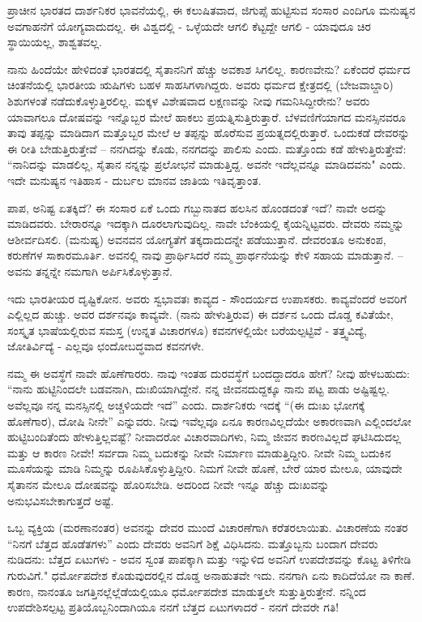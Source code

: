 ಪ್ರಾಚೀನ ಭಾರತದ ದಾರ್ಶನಿಕರ ಭಾವನೆಯಲ್ಲಿ, ಈ ಕಲುಷಿತವಾದ, ಜಿಗುಪ್ಸೆ ಹುಟ್ಟಿಸುವ ಸಂಸಾರ ಎಂದಿಗೂ ಮನುಷ್ಯನ ಅವಗಾಹನೆಗೆ ಯೋಗ್ಯವಾದುದಲ್ಲ. ಈ ವಿಶ್ವದಲ್ಲಿ - ಒಳ್ಳೆಯದೇ ಆಗಲಿ ಕೆಟ್ಟದ್ದೇ ಆಗಲಿ - ಯಾವುದೂ ಚಿರ ಸ್ಥಾಯಿಯಲ್ಲ, ಶಾಶ್ವತವಲ್ಲ.

ನಾನು ಹಿಂದೆಯೇ ಹೇಳಿದಂತೆ ಭಾರತದಲ್ಲಿ ಸೈತಾನನಿಗೆ ಹೆಚ್ಚು ಅವಕಾಶ ಸಿಗಲಿಲ್ಲ. ಕಾರಣವೇನು? ಏಕೆಂದರೆ ಧರ್ಮದ ಚಿಂತನೆಯಲ್ಲಿ ಭಾರತೀಯ ಋಷಿಗಳು ಬಹಳ ಸಾಹಸಿಗಳಾಗಿದ್ದರು. ಅವರು ಧರ್ಮದ ಕ್ಷೇತ್ರದಲ್ಲಿ (ಬೇಜವಾಬ್ದಾರಿ) ಶಿಶುಗಳಂತೆ ನಡೆದುಕೊಳ್ಳುತ್ತಿರಲಿಲ್ಲ. ಮಕ್ಕಳ ವಿಶೇಷವಾದ ಲಕ್ಷಣವನ್ನು ನೀವು ಗಮನಿಸಿದ್ದೀರೇನು? ಅವರು ಯಾವಾಗಲೂ ದೋಷವನ್ನು ಇನ್ನೊಬ್ಬರ ಮೇಲೆ ಹಾಕಲು ಪ್ರಯತ್ನಿಸುತ್ತಿರುತ್ತಾರೆ. ಬೆಳವಣಿಗೆಯಾಗದ ಮನಸ್ಸಿನವರೂ ತಾವು ತಪ್ಪನ್ನು ಮಾಡಿದಾಗ ಮತ್ತೊಬ್ಬರ ಮೇಲೆ ಆ ತಪ್ಪನ್ನು ಹೊರೆಸುವ ಪ್ರಯತ್ನದಲ್ಲಿರುತ್ತಾರೆ. ಒಂದುಕಡೆ ದೇವರನ್ನು ಈ ರೀತಿ ಬೇಡುತ್ತಿರುತ್ತೇವೆ – ನನಗಿದನ್ನು ಕೊಡು, ನನಗದನ್ನು ಪಾಲಿಸು ಎಂದು. ಮತ್ತೊಂದು ಕಡೆ ಹೇಳುತ್ತಿರುತ್ತೇವೆ: “ನಾನಿದನ್ನು ಮಾಡಲಿಲ್ಲ, ಸೈತಾನ ನನ್ನನ್ನು ಪ್ರಲೋಭನೆ ಮಾಡುತ್ತಿದ್ದ. ಅವನೇ ಇದೆಲ್ಲವನ್ನೂ ಮಾಡಿದವನು" ಎಂದು. ಇದೇ ಮನುಷ್ಯನ ಇತಿಹಾಸ - ದುರ್ಬಲ ಮಾನವ ಜಾತಿಯ ಇತಿವೃತ್ತಾಂತ.

ಪಾಪ, ಅನಿಷ್ಟ ಏತಕ್ಕಿದೆ? ಈ ಸಂಸಾರ ಏಕೆ ಒಂದು ಗಬ್ಬುನಾತದ ಹಲಸಿನ ಹೊಂಡದಂತೆ ಇದೆ? ನಾವೇ ಅದನ್ನು ಮಾಡಿದವರು. ಬೇರಾರನ್ನೂ ಇದಕ್ಕಾಗಿ ದೂರಲಾಗುವುದಿಲ್ಲ. ನಾವೇ ಬೆಂಕಿಯಲ್ಲಿ ಕೈಯನ್ನಿಟ್ಟವರು. ದೇವರು ನಮ್ಮನ್ನು ಆಶೀರ್ವದಿಸಲಿ. (ಮನುಷ್ಯ) ಅವನವನ ಯೋಗ್ಯತೆಗೆ ತಕ್ಕದಾದುದನ್ನೇ ಪಡೆಯುತ್ತಾನೆ. ದೇವರಂತೂ ಅನುಕಂಪ, ಕರುಣೆಗಳ ಸಾಕಾರಮೂರ್ತಿ. ಅವನಲ್ಲಿ ನಾವು ಪ್ರಾರ್ಥಿಸಿದರೆ ನಮ್ಮ ಪ್ರಾರ್ಥನೆಯನ್ನು ಕೇಳಿ ಸಹಾಯ ಮಾಡುತ್ತಾನೆ. – ಅವನು ತನ್ನನ್ನೇ ನಮಗಾಗಿ ಅರ್ಪಿಸಿಕೊಳ್ಳುತ್ತಾನೆ.

ಇದು ಭಾರತೀಯರ ದೃಷ್ಟಿಕೋನ. ಅವರು ಸ್ವಭಾವತಃ ಕಾವ್ಯದ - ಸೌಂದರ್ಯದ ಉಪಾಸಕರು. ಕಾವ್ಯವೆಂದರೆ ಅವರಿಗೆ ಎಲ್ಲಿಲ್ಲದ ಹುಚ್ಚು. ಅವರ ದರ್ಶನವೂ ಕಾವ್ಯವೇ. (ನಾನು ಹೇಳುತ್ತಿರುವ) ಈ ದರ್ಶನ ಒಂದು ದೊಡ್ಡ ಕವಿತೆಯೇ, ಸಂಸ್ಕೃತ ಭಾಷೆಯಲ್ಲಿರುವ ಸಮಸ್ತ (ಉನ್ನತ ವಿಚಾರಗಳೂ) ಕವನಗಳಲ್ಲಿಯೇ ಬರೆಯಲ್ಪಟ್ಟಿವೆ - ತತ್ತ್ವವಿದ್ಯೆ, ಜೋತಿರ್ವಿದ್ಯೆ - ಎಲ್ಲವೂ ಛಂದೋಬದ್ಧವಾದ ಕವನಗಳೇ.

ನಮ್ಮ ಈ ಅವಸ್ಥೆಗೆ ನಾವೇ ಹೊಣೆಗಾರರು. ನಾವು ಇಂತಹ ದುರವಸ್ಥೆಗೆ ಬಂದದ್ದಾದರೂ ಹೇಗೆ? ನೀವು ಹೇಳಬಹುದು: “ನಾನು ಹುಟ್ಟಿನಿಂದಲೇ ಬಡವನಾಗಿ, ದುಃಖಿಯಾಗಿದ್ದೇನೆ. ನನ್ನ ಜೀವನದುದ್ದಕ್ಕೂ ನಾನು ಪಟ್ಟ ಪಾಡು ಅಷ್ಟಿಷ್ಟಲ್ಲ. ಅವೆಲ್ಲವೂ ನನ್ನ ಮನಸ್ಸಿನಲ್ಲಿ ಅಚ್ಚಳಿಯದೇ ಇದೆ'' ಎಂದು. ದಾರ್ಶನಿಕರು ಇದಕ್ಕೆ “(ಈ ದುಃಖ ಭೋಗಕ್ಕೆ ಹೊಣೆಗಾರ), ದೋಷಿ ನೀನೇ'' ಎನ್ನುವರು. ನೀವು ಇವೆಲ್ಲವೂ ಏನೂ ಕಾರಣವಿಲ್ಲದೆಯೇ ಅಕಾರಣವಾಗಿ ಎಲ್ಲಿಂದಲೋ ಹುಟ್ಟಿಬಂದಿತೆಂದು ಹೇಳುತ್ತಿಲ್ಲವಷ್ಟೆ? ನೀವಾದರೋ ವಿಚಾರವಾದಿಗಳು, ನಿಮ್ಮ ಜೀವನ ಕಾರಣವಿಲ್ಲದೆ ಘಟಿಸಿದುದಲ್ಲ ಮತ್ತು ಆ ಕಾರಣ ನೀವೇ! ಸರ್ವದಾ ನಿಮ್ಮ ಬದುಕನ್ನು ನೀವೇ ನಿರ್ಮಾಣ ಮಾಡುತ್ತಿದ್ದೀರಿ. ನೀವೇ ನಿಮ್ಮ ಬದುಕಿನ ಮೂಸೆಯನ್ನು ಮಾಡಿ ನಿಮ್ಮನ್ನು ರೂಪಿಸಿಕೊಳ್ಳುತ್ತಿದ್ದೀರಿ. ನಿಮಗೆ ನೀವೇ ಹೊಣೆ, ಬೇರೆ ಯಾರ ಮೇಲೂ, ಯಾವುದೇ ಸೈತಾನನ ಮೇಲೂ ದೋಷವನ್ನು ಹೊರಿಸಬೇಡಿ. ಅದರಿಂದ ನೀವೇ ಇನ್ನೂ ಹೆಚ್ಚು ದುಃಖವನ್ನು ಅನುಭವಿಸಬೇಕಾಗುತ್ತದೆ ಅಷ್ಟೆ.

ಒಬ್ಬ ವ್ಯಕ್ತಿಯ (ಮರಣಾನಂತರ) ಅವನನ್ನು ದೇವರ ಮುಂದೆ ವಿಚಾರಣೆಗಾಗಿ ಕರೆತರಲಾಯಿತು. ವಿಚಾರಣೆಯ ನಂತರ “ನಿನಗೆ  ಬೆತ್ತದ ಹೊಡೆತಗಳು'' ಎಂದು ದೇವರು ಅವನಿಗೆ ಶಿಕ್ಷೆ ವಿಧಿಸಿದನು. ಮತ್ತೊಬ್ಬನು ಬಂದಾಗ ದೇವರು ನುಡಿದನು:  ಬೆತ್ತದ ಏಟುಗಳು -  ಅವನ ಸ್ವಂತ ಪಾಪಕ್ಕಾಗಿ ಮತ್ತು ಇನ್ನುಳಿದ  ಅವನಿಗೆ ಉಪದೇಶವನ್ನು ಕೊಟ್ಟ ತಿಳಿಗೇಡಿ ಗುರುವಿಗೆ." ಧರ್ಮೋಪದೇಶ ಕೊಡುವುದರಲ್ಲಿನ ದೊಡ್ಡ ಅನಾಹುತವೇ ಇದು. ನನಗಾಗಿ ಏನು ಕಾದಿದೆಯೋ ನಾ ಕಾಣೆ. ಕಾರಣ, ನಾನಂತೂ ಜಗತ್ತಿನಲ್ಲೆಲ್ಲೆಡೆಯಲ್ಲಿಯೂ ಧರ್ಮೋಪದೇಶ ಮಾಡುತ್ತಲೇ ಸುತ್ತುತ್ತಿರುತ್ತೇನೆ. ನನ್ನಿಂದ ಉಪದೇಶಿಸಲ್ಪಟ್ಟ ಪ್ರತಿಯೊಬ್ಬನಿಂದಾಗಿಯೂ ನನಗೆ  ಬೆತ್ತದ ಏಟುಗಳಾದರೆ - ನನಗೆ ದೇವರೇ ಗತಿ!

